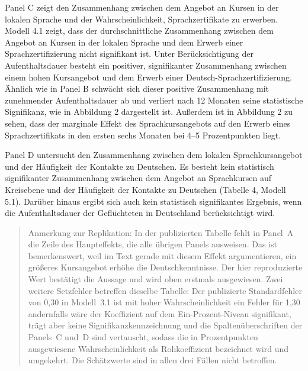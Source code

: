 Panel C zeigt den Zusammenhang zwischen dem Angebot an Kursen in der lokalen Sprache und der Wahrscheinlichkeit, Sprachzertifikate zu erwerben. Modell 4.1 zeigt, dass der durchschnittliche Zusammenhang zwischen dem Angebot an Kursen in der lokalen Sprache und dem Erwerb einer Sprachzertifizierung nicht signifikant ist. Unter Berücksichtigung der Aufenthaltsdauer besteht ein positiver, signifikanter Zusammenhang zwischen einem hohen Kursangebot und dem Erwerb einer Deutsch-Sprachzertifizierung. Ähnlich wie in Panel B schwächt sich dieser positive Zusammenhang mit zunehmender Aufenthaltsdauer ab und verliert nach 12 Monaten seine statistische Signifikanz, wie in Abbildung 2 dargestellt ist. Außerdem ist in Abbildung 2 zu sehen, dass der marginale Effekt des Sprachkursangebots auf den Erwerb eines Sprachzertifikats in den ersten sechs Monaten bei 4–5 Prozentpunkten liegt.

Panel D untersucht den Zusammenhang zwischen dem lokalen Sprachkursangebot und der Häufigkeit der Kontakte zu Deutschen. Es besteht kein statistisch signifikanter Zusammenhang zwischen dem Angebot an Sprachkursen auf Kreisebene und der Häufigkeit der Kontakte zu Deutschen (Tabelle 4, Modell 5.1). Darüber hinaus ergibt sich auch kein statistisch signifikantes Ergebnis, wenn die Aufenthaltsdauer der Geflüchteten in Deutschland berücksichtigt wird.









\begin{quote}
  \small Anmerkung zur Replikation: In der publizierten Tabelle fehlt in Panel~A
  die Zeile des Haupteffekts, die alle \"ubrigen Panels ausweisen. Das ist
  bemerkenswert, weil \textcite{Kanas:2023} im Text gerade mit diesem Effekt
  argumentieren, ein gr\"o{\ss}eres Kursangebot erh\"ohe die Deutschkenntnisse.
  Der hier reproduzierte Wert best\"atigt die Aussage und wird oben erstmals
  ausgewiesen. Zwei weitere Setzfehler betreffen dieselbe Tabelle: Der
  publizierte Standardfehler von 0,30 in Modell~3.1 ist mit hoher
  Wahrscheinlichkeit ein Fehler f\"ur 1,30 \textendash{} andernfalls w\"are der
  Koeffizient auf dem Ein-Prozent-Niveau signifikant, tr\"agt aber keine
  Signifikanzkennzeichnung \textendash{} und die Spalten\"uberschriften der
  Panels~C und~D sind vertauscht, sodass die in Prozentpunkten ausgewiesene
  Wahrscheinlichkeit als Rohkoeffizient bezeichnet wird und umgekehrt. Die
  Sch\"atzwerte sind in allen drei F\"allen nicht betroffen.
\end{quote}

